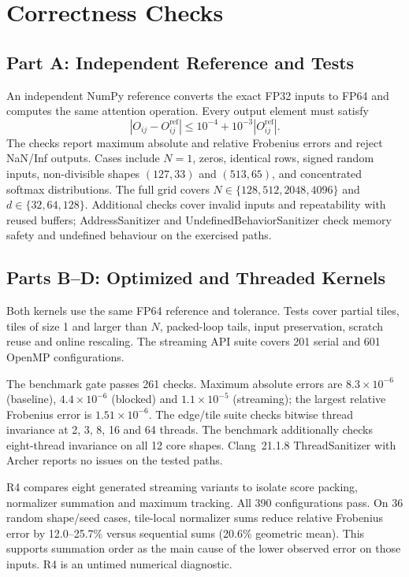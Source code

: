 \documentclass[11pt,a4paper]{article}
\begin{document}
\section{Correctness Checks}
\subsection{Part A: Independent Reference and Tests}
An independent NumPy reference converts the exact FP32 inputs to FP64 and
computes the same attention operation. Every output element must satisfy
\[
|O_{ij}-O^{\mathrm{ref}}_{ij}|
\leq 10^{-4}+10^{-3}|O^{\mathrm{ref}}_{ij}|.
\]
The checks report maximum absolute and relative Frobenius errors and reject
NaN/Inf outputs. Cases include $N=1$, zeros, identical rows, signed random
inputs, non-divisible shapes $(127,33)$ and $(513,65)$, and concentrated
softmax distributions. The full grid covers
$N\in\{128,512,2048,4096\}$ and $d\in\{32,64,128\}$.
Additional checks cover invalid inputs and repeatability with reused buffers;
AddressSanitizer and UndefinedBehaviorSanitizer check memory safety and
undefined behaviour on the exercised paths.

\subsection{Parts B--D: Optimized and Threaded Kernels}
\label{sec:correct-bcd}
Both kernels use the same FP64 reference and tolerance. Tests cover partial
tiles, tiles of size 1 and larger than $N$, packed-loop tails, input preservation,
scratch reuse and online rescaling. The streaming API suite covers 201 serial
and 601 OpenMP configurations.

The benchmark gate passes 261 checks. Maximum absolute errors are
$8.3\times10^{-6}$ (baseline), $4.4\times10^{-6}$ (blocked) and
$1.1\times10^{-5}$ (streaming); the largest relative Frobenius error is
$1.51\times10^{-6}$. The edge/tile suite checks bitwise thread invariance at
2, 3, 8, 16 and 64 threads. The benchmark additionally checks eight-thread
invariance on all 12 core shapes. Clang~21.1.8 ThreadSanitizer with Archer
reports no issues on the tested paths.

R4 compares eight generated streaming variants to isolate score packing,
normalizer summation and maximum tracking. All 390 configurations pass.
On 36 random shape/seed cases, tile-local normalizer sums reduce relative
Frobenius error by 12.0--25.7\% versus sequential sums (20.6\% geometric mean).
This supports summation order as the main cause of the lower observed error
on those inputs. R4 is an untimed numerical diagnostic.
\end{document}
